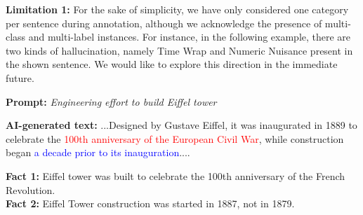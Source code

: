 \textbf{Limitation 1:} For the sake of simplicity, we have only considered one category per sentence during annotation, although we acknowledge the presence of multi-class and multi-label instances. For instance, in the following example, there are two kinds of hallucination, namely Time Wrap and Numeric Nuisance present in the shown sentence. We would like to explore this direction in the immediate future. 

\vspace{-3mm}

\begin{tcolorbox}[enhanced,attach boxed title to top right={yshift=-2.5mm,yshifttext=-1mm}, left=1pt,right=1pt,top=1pt,bottom=1pt,
  colback=blue!5!white,colframe=blue!75!black,colbacktitle=red!80!black,
  title=alarming,fonttitle=\ttfamily\bfseries\scshape\fontsize{9}{9.6}\selectfont,
  boxed title style={size=fbox,colframe=red!50!black} ]
    \label{tab:misc}
  \begin{spacing}{0.75}
  \textbf{\scriptsize Prompt:} \textit{\scriptsize Engineering effort to build Eiffel tower}
  \end{spacing}

  \vspace{-2mm}
  \DrawLine

  \begin{spacing}{0.75}
  \textbf{\scriptsize AI-generated text:} {\scriptsize\selectfont
  ...Designed by Gustave Eiffel, it was inaugurated in 1889 to celebrate the \textcolor{red}{100th anniversary of the European Civil War}, while construction began \textcolor{blue}{a decade prior to its inauguration}....}
  \end{spacing}

  \vspace{-2mm}
  \DrawLine

  \textbf{\scriptsize Fact 1:} \scriptsize Eiffel tower was built to celebrate the 100th anniversary of the French Revolution.\\
  \textbf{\scriptsize Fact 2:} \scriptsize Eiffel Tower construction was started in 1887, not in 1879.

\end{tcolorbox}

